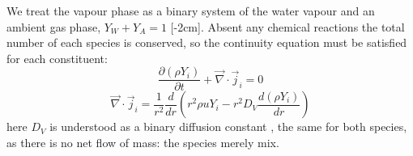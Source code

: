 \documentclass[12pt,twoside]{report}
\begin{document}
We treat the vapour phase as a binary system of the water vapour and an ambient gas phase, $Y_W + Y_A = 1$%
[-2cm].
Absent any chemical reactions the total number of each species is conserved, so the continuity equation must be satisfied for each constituent:
\begin{equation}
  \frac{\partial (\rho Y_i)}{\partial t}
  + \vec{\nabla} \cdot \vec{j}_i = 0
\end{equation}
\begin{equation}
  \vec{\nabla} \cdot \vec{j}_i =
  \frac{1}{r^2} \frac{d}{dr} \left(
  r^2 \rho u Y_i - r^2 D_V \frac{d(\rho Y_i)}{dr}
  \right)
\end{equation}
here $D_V$ is understood as a binary diffusion constant%
,
the same for both species, as there is no net flow of mass: the species merely mix.
\end{document}

